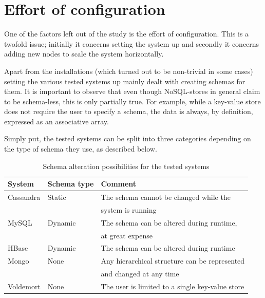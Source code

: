 \section{Effort of configuration}
One of the factors left out of the study is the effort of configuration. This is a twofold issue; initially it concerns setting the system up and secondly it concerns adding new nodes to scale the system horizontally.

Apart from the installations (which turned out to be non-trivial in some cases) setting the various tested systems up mainly dealt with creating schemas for them. It is important to observe that even though NoSQL-stores in general claim to be schema-less, this is only partially true. For example, while a key-value store does not require the user to specify a schema, the data is always, by definition, expressed as an associative array.

Simply put, the tested systems can be split into three categories depending on the type of schema they use, as described below.

\begin{table} [ht]
\caption{Schema alteration possibilities for the tested systems}
\centering
\begin{tabular}{l|l|l}
\hline\hline
System    &	 Schema type &  Comment                                                                \\
\hline
Cassandra &  Static      &  The schema cannot be changed while the                                 \\
          &              &  system is running                                                      \\
MySQL     &  Dynamic     &  The schema can be altered during runtime,                              \\
          &              &  at great expense                                                       \\
HBase     &  Dynamic     &  The schema can be altered during runtime                               \\
Mongo     &  None        &  Any hierarchical structure can be represented                          \\
          &              &  and changed at any time                                                \\
Voldemort &  None        &  The user is limited to a single key-value store                        \\
\hline
\end{tabular}
\end{table}

